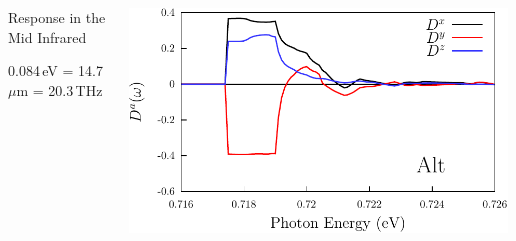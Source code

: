 \documentclass{beamer}
\begin{document}
\begin{frame}
\begin{columns}
\begin{center}
\begin{figure}[h!]
\end{figure}

\vspace{-5mm}

Response in the Mid Infrared

0.084\,eV = 14.7\,$\mu$m = 20.3\,THz

\end{center}

\begin{center}
\small

\vspace{-5mm}   
\includegraphics[width=0.99\textwidth]{figs/plots/dsp-alt.pdf}

\vspace{-4mm}
\begin{figure}[h!]
\begin{tikzpicture}


\end{tikzpicture}
\end{figure}
\end{center}
\end{columns}
\end{frame}
\end{document}
